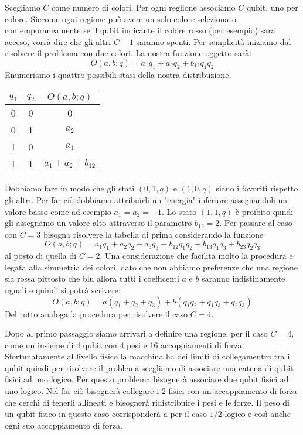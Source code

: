 Scegliamo $C$ come numero di colori. Per ogni reglione associamo $C$ qubit, uno per colore. Siccome ogni regione può avere un solo colore selezionato contemporaneamente se il qubit indicante il colore rosso (per esempio) sara acceso, vorrà dire che gli altri $C-1$ saranno spenti.
Per semplicità iniziamo dal risolvere il problema con due colori. La nostra funzione oggetto sarà:
$$O(a, b; q) = a_1 q_1 + a_2 q_2 + b_12 q_1 q_2$$
Enumeriamo i quattro possibili stasi della nostra distribuzione.
\begin{center}
  \begin{tabular}{ c | c | c }
    $q_1$ & $q_2$ & $O(a, b; q)$       \\ \hline
    0     & 0     & 0                  \\
    0     & 1     & $a_2$              \\
    1     & 0     & $a_1$              \\
    1     & 1     & $a_1 + a_2 + b_12$ \\
  \end{tabular}
\end{center}
Dobbiamo fare in modo che gli stati $(0,1,q)$ e $(1,0,q)$ siano i favoriti rispetto gli altri. Per far ciò dobbiamo attribuirli un "energia" inferiore assegnandoli un valore basso come ad esempio $a_1 = a_2 = -1$. Lo stato $(1,1,q)$ è proibito qundi gli assegnamo un valore alto attraverso il parametro $b_12 = 2$.
Per passare al caso con $C = 3$ bisogna risolvere la tabella di prima considerando la funzione
$$O(a, b; q) = a_1 q_1 + a_2 q_2 + a_3 q_3 + b_12 q_1 q_2 + b_13 q_1 q_3 + b_23 q_2 q_3$$
al posto di quella di $C = 2$. Una considerazione che facilita molto la procedura e legata alla simmetria dei colori, dato che non abbiamo preferenze che una regione sia rossa pittosto che blu allora tutti i coefficenti $a$ e $b$ saranno indistinamente uguali e quindi si potrà scrivere:
$$O(a, b; q) = a (q_1 + q_2 + q_3) + b (q_1 q_2 + q_1 q_3 + q_2 q_3)$$
Del tutto analoga la procedura per risolvere il caso $C = 4$.

Dopo al primo passaggio siamo arrivari a definire una regione, per il caso $C = 4$, come un insieme di 4 qubit con 4 pesi e 16 accoppiamenti di forza. Sfortunatamente al livello fisico la macchina ha dei limiti di collegamentro tra i qubit quindi per risolvere il problema scegliamo di associare una catena di qubit fisici ad uno logico. Per questo problema bisognerà associare due qubit fisici ad uno logico. Nel far ciò bisognerà collegare i 2 fisici con un accoppiamento di forza che cerchi di tenerli allineati e bisognerà ridistribuire i pesi e le forze. Il peso di un qubit fisico in questo caso corrisponderà a per il caso $1/2$ logico e così anche ogni suo accoppiamento di forza.

